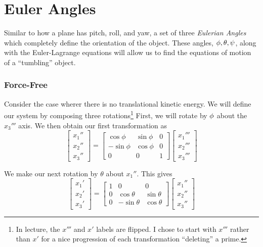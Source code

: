 \section{Euler Angles}
Similar to how a plane has pitch, roll, and yaw, a set of three \emph{Eulerian Angles} which completely define the orientation of the object. These angles, \(\phi,\theta,\psi\), along with the Euler-Lagrange equations will allow us to find the equations of motion of a ``tumbling'' object.

\subsubsection{Force-Free}
Consider the case wherer there is no translational kinetic energy. We will define our system by composing three rotations\footnote{In lecture, the \(x'''\) and \(x'\) labels are flipped. I chose to start with \(x'''\) rather than \(x'\) for a nice progression of each transformation ``deleting'' a prime.} First, we will rotate by \(\phi\) about the \(x_3'''\) axis. We then obtain our first transformation as
\[ \begin{bmatrix}
	x_1''\\x_2''\\x_3''
\end{bmatrix}= \begin{bmatrix}
\cos\phi & \sin\phi & 0\\
-\sin\phi & \cos\phi & 0 \\
0&0&1
\end{bmatrix} \begin{bmatrix}
	x_1'''\\x_2'''\\x_3'''
\end{bmatrix}\]

We make our next rotation by \(\theta\) about \(x_1''\). This gives
\[ \begin{bmatrix}
	x_1'\\ x_2'\\x_3'
\end{bmatrix}=
\begin{bmatrix}
	1 & 0 & 0\\
	0 & \cos\theta & \sin\theta\\
	0 & -\sin\theta & \cos\theta
\end{bmatrix}
\begin{bmatrix}
	x_1''\\x_2''\\x_3''
\end{bmatrix} \]

